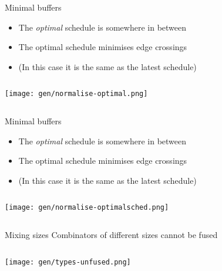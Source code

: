 \documentclass{beamer}
\begin{document}
\begin{frame}[fragile,b]{Minimal buffers}

\begin{itemize}
\item The \emph{optimal} schedule is somewhere in between
\item The optimal schedule minimises edge crossings
\item (In this case it is the same as the latest schedule)
\end{itemize}

\begin{columns}
\column[t]{5cm}

\column[t]{5cm}

\texttt{[image: gen/normalise-optimal.png]}

\end{columns}
\end{frame}

\begin{frame}[fragile,b]{Minimal buffers}

\begin{itemize}
\item The \emph{optimal} schedule is somewhere in between
\item The optimal schedule minimises edge crossings
\item (In this case it is the same as the latest schedule)
\end{itemize}

\begin{columns}
\column[t]{5cm}

\column[t]{5cm}

\texttt{[image: gen/normalise-optimalsched.png]}

\end{columns}
\end{frame}


\begin{frame}[fragile,b]{Mixing sizes}
Combinators of different sizes cannot be fused

\begin{columns}
\column[t]{5cm}

\column[t]{5cm}

\texttt{[image: gen/types-unfused.png]}

\end{columns}
\end{frame}
\end{document}
